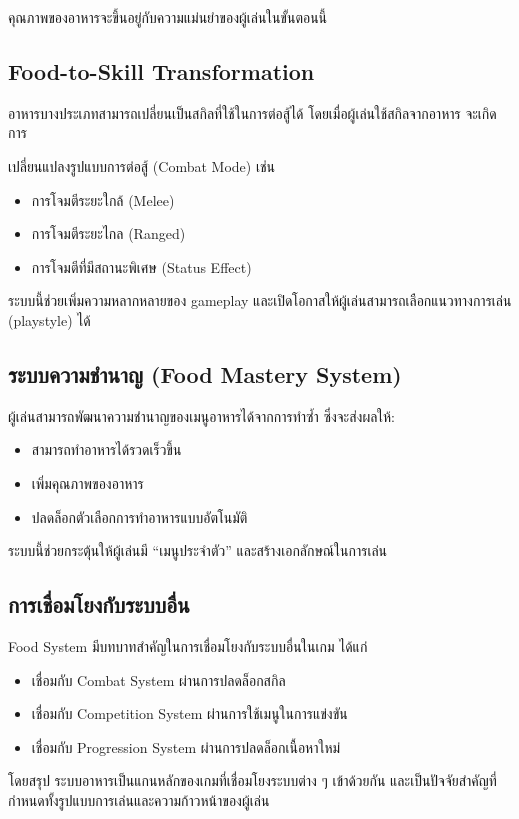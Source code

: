 คุณภาพของอาหารจะขึ้นอยู่กับความแม่นยำของผู้เล่นในขั้นตอนนี้

\subsection{Food-to-Skill Transformation}

อาหารบางประเภทสามารถเปลี่ยนเป็นสกิลที่ใช้ในการต่อสู้ได้ โดยเมื่อผู้เล่นใช้สกิลจากอาหาร จะเกิดการ
\par\vspace{0.5em}\noindent
เปลี่ยนแปลงรูปแบบการต่อสู้ (Combat Mode) เช่น

\begin{itemize}
\item การโจมตีระยะใกล้ (Melee)
\item การโจมตีระยะไกล (Ranged)
\item การโจมตีที่มีสถานะพิเศษ (Status Effect)
\end{itemize}

ระบบนี้ช่วยเพิ่มความหลากหลายของ gameplay และเปิดโอกาสให้ผู้เล่นสามารถเลือกแนวทางการเล่น (playstyle) ได้

\subsection{ระบบความชำนาญ (Food Mastery System)}

ผู้เล่นสามารถพัฒนาความชำนาญของเมนูอาหารได้จากการทำซ้ำ ซึ่งจะส่งผลให้:

\begin{itemize}
\item สามารถทำอาหารได้รวดเร็วขึ้น
\item เพิ่มคุณภาพของอาหาร
\item ปลดล็อกตัวเลือกการทำอาหารแบบอัตโนมัติ
\end{itemize}

ระบบนี้ช่วยกระตุ้นให้ผู้เล่นมี “เมนูประจำตัว” และสร้างเอกลักษณ์ในการเล่น

\subsection{การเชื่อมโยงกับระบบอื่น}

Food System มีบทบาทสำคัญในการเชื่อมโยงกับระบบอื่นในเกม ได้แก่

\begin{itemize}
\item เชื่อมกับ Combat System ผ่านการปลดล็อกสกิล
\item เชื่อมกับ Competition System ผ่านการใช้เมนูในการแข่งขัน
\item เชื่อมกับ Progression System ผ่านการปลดล็อกเนื้อหาใหม่
\end{itemize}
\par\vspace{0.5em}\noindent
โดยสรุป ระบบอาหารเป็นแกนหลักของเกมที่เชื่อมโยงระบบต่าง ๆ เข้าด้วยกัน และเป็นปัจจัยสำคัญที่กำหนดทั้งรูปแบบการเล่นและความก้าวหน้าของผู้เล่น

